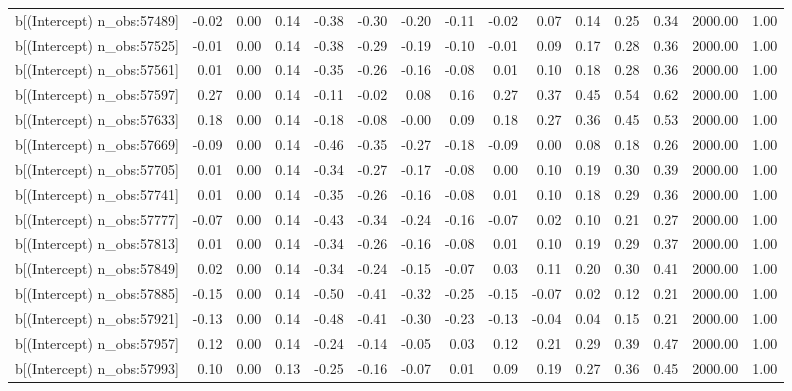\begin{table}[ht]
\begin{tabular}{rrrrrrrrrrrrrrr}
  b[(Intercept) n\_obs:57489] & -0.02 & 0.00 & 0.14 & -0.38 & -0.30 & -0.20 & -0.11 & -0.02 & 0.07 & 0.14 & 0.25 & 0.34 & 2000.00 & 1.00 \\ 
  b[(Intercept) n\_obs:57525] & -0.01 & 0.00 & 0.14 & -0.38 & -0.29 & -0.19 & -0.10 & -0.01 & 0.09 & 0.17 & 0.28 & 0.36 & 2000.00 & 1.00 \\ 
  b[(Intercept) n\_obs:57561] & 0.01 & 0.00 & 0.14 & -0.35 & -0.26 & -0.16 & -0.08 & 0.01 & 0.10 & 0.18 & 0.28 & 0.36 & 2000.00 & 1.00 \\ 
  b[(Intercept) n\_obs:57597] & 0.27 & 0.00 & 0.14 & -0.11 & -0.02 & 0.08 & 0.16 & 0.27 & 0.37 & 0.45 & 0.54 & 0.62 & 2000.00 & 1.00 \\ 
  b[(Intercept) n\_obs:57633] & 0.18 & 0.00 & 0.14 & -0.18 & -0.08 & -0.00 & 0.09 & 0.18 & 0.27 & 0.36 & 0.45 & 0.53 & 2000.00 & 1.00 \\ 
  b[(Intercept) n\_obs:57669] & -0.09 & 0.00 & 0.14 & -0.46 & -0.35 & -0.27 & -0.18 & -0.09 & 0.00 & 0.08 & 0.18 & 0.26 & 2000.00 & 1.00 \\ 
  b[(Intercept) n\_obs:57705] & 0.01 & 0.00 & 0.14 & -0.34 & -0.27 & -0.17 & -0.08 & 0.00 & 0.10 & 0.19 & 0.30 & 0.39 & 2000.00 & 1.00 \\ 
  b[(Intercept) n\_obs:57741] & 0.01 & 0.00 & 0.14 & -0.35 & -0.26 & -0.16 & -0.08 & 0.01 & 0.10 & 0.18 & 0.29 & 0.36 & 2000.00 & 1.00 \\ 
  b[(Intercept) n\_obs:57777] & -0.07 & 0.00 & 0.14 & -0.43 & -0.34 & -0.24 & -0.16 & -0.07 & 0.02 & 0.10 & 0.21 & 0.27 & 2000.00 & 1.00 \\ 
  b[(Intercept) n\_obs:57813] & 0.01 & 0.00 & 0.14 & -0.34 & -0.26 & -0.16 & -0.08 & 0.01 & 0.10 & 0.19 & 0.29 & 0.37 & 2000.00 & 1.00 \\ 
  b[(Intercept) n\_obs:57849] & 0.02 & 0.00 & 0.14 & -0.34 & -0.24 & -0.15 & -0.07 & 0.03 & 0.11 & 0.20 & 0.30 & 0.41 & 2000.00 & 1.00 \\ 
  b[(Intercept) n\_obs:57885] & -0.15 & 0.00 & 0.14 & -0.50 & -0.41 & -0.32 & -0.25 & -0.15 & -0.07 & 0.02 & 0.12 & 0.21 & 2000.00 & 1.00 \\ 
  b[(Intercept) n\_obs:57921] & -0.13 & 0.00 & 0.14 & -0.48 & -0.41 & -0.30 & -0.23 & -0.13 & -0.04 & 0.04 & 0.15 & 0.21 & 2000.00 & 1.00 \\ 
  b[(Intercept) n\_obs:57957] & 0.12 & 0.00 & 0.14 & -0.24 & -0.14 & -0.05 & 0.03 & 0.12 & 0.21 & 0.29 & 0.39 & 0.47 & 2000.00 & 1.00 \\ 
  b[(Intercept) n\_obs:57993] & 0.10 & 0.00 & 0.13 & -0.25 & -0.16 & -0.07 & 0.01 & 0.09 & 0.19 & 0.27 & 0.36 & 0.45 & 2000.00 & 1.00 \\ 

\end{tabular}
\end{table}
